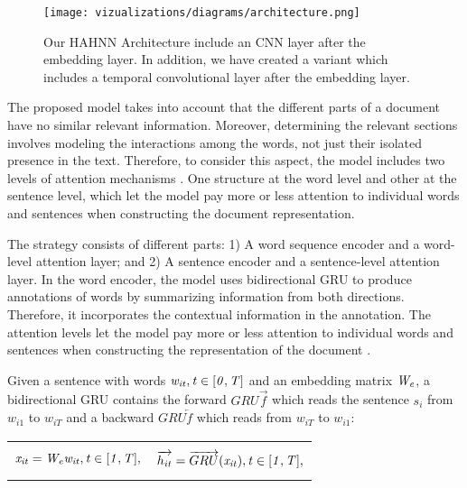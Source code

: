\documentclass[runningheads]{llncs}
\begin{document}
\begin{figure}[!h]
    \centering
\texttt{[image: vizualizations/diagrams/architecture.png]}
    \caption{Our HAHNN Architecture include an CNN layer after the embedding  layer. In addition, we have created a variant which includes a temporal convolutional layer \cite{c6} after the embedding layer.}
    \label{fig:fig1}
\end{figure}

\vspace{-6mm}

The proposed model takes into account that the different parts of a document have no similar relevant information. Moreover, determining the relevant sections involves modeling the interactions among the words, not just their isolated presence in the text. Therefore, to consider this aspect, the model includes two levels of attention mechanisms \cite{c4}. One structure at the word level and other at the sentence level, which let the model pay more or less attention to individual words and sentences when constructing the document representation.

The strategy consists of different parts: 1) A word sequence encoder and a word-level attention layer; and 2) A sentence encoder and a sentence-level attention layer. In the word encoder, the model uses bidirectional GRU \cite{c4} to produce annotations of words by summarizing information from both directions. Therefore, it incorporates the contextual information in the annotation. The attention levels let the model pay more or less attention to individual words and sentences when constructing the representation of the document \cite{c1}.

Given a sentence with words $\it{w}_{it},t \in [0, T]$ and an embedding matrix $\it{W_e}$, a bidirectional GRU contains the forward $GRU \overrightarrow{f}$ which reads the sentence $s_i$ from $w_{i1}$ to $w_{iT}$ and a backward $GRU \overleftarrow{f}$ which reads from  $w_{iT}$ to $w_{i1}$:







\noindent
\begin{tabularx}{\linewidth}{XX}
    \begin{equation}
        \it{x_{it}} = W_ew_{it}, t \in [1,T], 
    \end{equation}
    &
    \begin{equation}
      \overrightarrow{h_{it}} = \overrightarrow{GRU}(\it{x_{it}}), t \in [1,T],
    \end{equation}
    
\end{tabularx}
\end{document}
